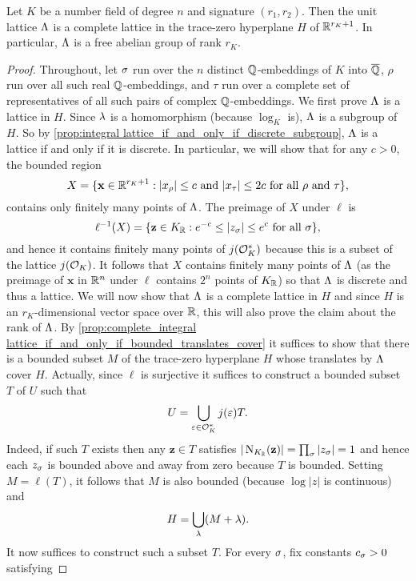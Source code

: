     \begin{theorem}\label{thm:unit_group_complete_lattice}
      Let $K$ be a number field of degree $n$ and signature $(r_{1},r_{2})$. Then the unit lattice $\Lambda$ is a complete lattice in the trace-zero hyperplane $H$ of $\mathbb{R}^{r_{K}+1}$. In particular, $\Lambda$ is a free abelian group of rank $r_{K}$.
    \end{theorem}
    \begin{proof}
      Throughout, let $\sigma$ run over the $n$ distinct $\mathbb{Q}$-embeddings of $K$ into $\overline{\mathbb{Q}}$, $\rho$ run over all such real $\mathbb{Q}$-embeddings, and $\tau$ run over a complete set of representatives of all such pairs of complex $\mathbb{Q}$-embeddings. We first prove $\Lambda$ is a lattice in $H$. Since $\lambda$ is a homomorphism (because $\log_{K}$ is), $\Lambda$ is a subgroup of $H$. So by \cref{prop:integral lattice_if_and_only_if_discrete_subgroup}, $\Lambda$ is a lattice if and only if it is discrete. In particular, we will show that for any $c > 0$, the bounded region
      \[
        X = \{\mathbf{x} \in \mathbb{R}^{r_{K}+1}:\text{$|x_{\rho}| \le c$ and $|x_{\tau}| \le 2c$ for all $\rho$ and $\tau$}\},
      \]
      contains only finitely many points of $\Lambda$. The preimage of $X$ under $\ell$ is
      \[
        \ell^{-1}(X) = \{\mathbf{z} \in K_{\mathbb{R}}:\text{$e^{-c} \le |z_{\sigma}| \le e^{c}$ for all $\sigma$}\},
      \]
      and hence it contains finitely many points of $j(\mathcal{O}_{K}^{\ast})$ because this is a subset of the lattice $j(\mathcal{O}_{K})$. It follows that $X$ contains finitely many points of $\Lambda$ (as the preimage of $\mathbf{x}$ in $\mathbb{R}^{n}$ under $\ell$ contains $2^{n}$ points of $K_{\mathbb{R}}$) so that $\Lambda$ is discrete and thus a lattice. We will now show that $\Lambda$ is a complete lattice in $H$ and since $H$ is an $r_{K}$-dimensional vector space over $\mathbb{R}$, this will also prove the claim about the rank of $\Lambda$. By \cref{prop:complete_integral lattice_if_and_only_if_bounded_translates_cover} it suffices to show that there is a bounded subset $M$ of the trace-zero hyperplane $H$ whose translates by $\Lambda$ cover $H$. Actually, since $\ell$ is surjective it suffices to construct a bounded subset $T$ of $U$ such that
      \[
        U = \bigcup_{\varepsilon \in \mathcal{O}_{K}^{\ast}}j(\varepsilon)T.
      \]
      Indeed, if such $T$ exists then any $\mathbf{z} \in T$ satisfies $|\operatorname{\mathrm{N}}_{K_{\mathbb{R}}}(\mathbf{z})| = \prod_{\sigma}|z_{\sigma}| = 1$ and hence each $z_{\sigma}$ is bounded above and away from zero because $T$ is bounded. Setting $M = \ell(T)$, it follows that $M$ is also bounded (because $\log|z|$ is continuous) and
      \[
        H = \bigcup_{\lambda}(M+\lambda).
      \]
      It now suffices to construct such a subset $T$. For every $\sigma$, fix constants $c_{\sigma} > 0$ satisfying

\end{proof}
